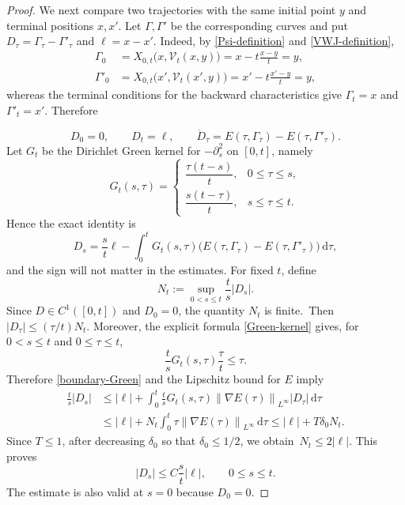 \documentclass[10pt,a4paper]{amsart}
\newcommand{\dd}{\,\mathrm d}
\newcommand{\norm}[1]{\left\lVert #1\right\rVert}
\begin{document}
\begin{proof}
We next compare two trajectories with the same initial point $y$ and terminal
positions $x,x'$.  Let $\Gamma,\Gamma'$ be the corresponding curves and put
$D_\tau=\Gamma_\tau-\Gamma'_\tau$ and $\ell=x-x'$.
Indeed, by \eqref{Psi-definition} and
\eqref{VWJ-definition},
\begin{align*}
 \Gamma_0
 &=X_{0,t}\bigl(x,\mathcal V_t(x,y)\bigr)
   =x-t\frac{x-y}{t}=y,\\
 \Gamma'_0
 &=X_{0,t}\bigl(x',\mathcal V_t(x',y)\bigr)
   =x'-t\frac{x'-y}{t}=y,
\end{align*}
whereas the terminal conditions for the backward characteristics give
$\Gamma_t=x$ and $\Gamma'_t=x'$.  Therefore

\begin{equation*}
 D_0=0,\qquad D_t=\ell,\qquad
 \ddot D_\tau=E(\tau,\Gamma_\tau)-E(\tau,\Gamma'_\tau).
\end{equation*}
Let $G_t$ be the Dirichlet Green kernel for $-\partial_s^2$ on $[0,t]$,
namely
\begin{equation}\label{Green-kernel}
 G_t(s,\tau)=
 \begin{cases}
  \dfrac{\tau(t-s)}{t},&0\leq\tau\leq s,\\[2mm]
  \dfrac{s(t-\tau)}{t},&s\leq\tau\leq t.
 \end{cases}
\end{equation}
Hence the exact identity is
\begin{equation}\label{boundary-Green}
 D_s=\frac{s}{t}\ell-
 \int_0^tG_t(s,\tau)
 \bigl(E(\tau,\Gamma_\tau)-E(\tau,\Gamma'_\tau)\bigr)\dd\tau,
\end{equation}
and the sign will not matter in the estimates.  For fixed $t$, define
\begin{equation*}
 N_t:=\sup_{0<s\leq t}\frac{t}{s}|D_s|.
\end{equation*}
 Since $D\in C^1([0,t])$ and $D_0=0$, the quantity $N_t$ is finite.\
Then $|D_\tau|\leq(\tau/t)N_t$.  Moreover, the explicit formula
\eqref{Green-kernel} gives, for $0<s\leq t$ and $0\leq\tau\leq t$,
\begin{equation*}
 \frac{t}{s}G_t(s,\tau)\frac{\tau}{t}\leq\tau.
\end{equation*}
Therefore \eqref{boundary-Green} and the Lipschitz bound for $E$ imply
 \begin{align*}
 \frac{t}{s}|D_s|
 &\leq |\ell|+\int_0^t\frac{t}{s}G_t(s,\tau)
        \norm{\nabla E(\tau)}_{L^\infty} |D_\tau|\dd\tau\\
 &\leq |\ell|+N_t\int_0^t\tau
        \norm{\nabla E(\tau)}_{L^\infty}\dd\tau
 \leq |\ell|+T\delta_0N_t.
\end{align*} 
 Since $T\leq1$, after decreasing $\delta_0$ so that
$\delta_0\leq1/2$, we obtain\
$N_t\leq2|\ell|$.  This proves
\begin{equation}\label{two-endpoint-position}
 |D_s|\leq C\frac{s}{t}|\ell|,\qquad0\leq s\leq t.
\end{equation}
The estimate is also valid at $s=0$ because $D_0=0$.


\end{proof}
\end{document}
